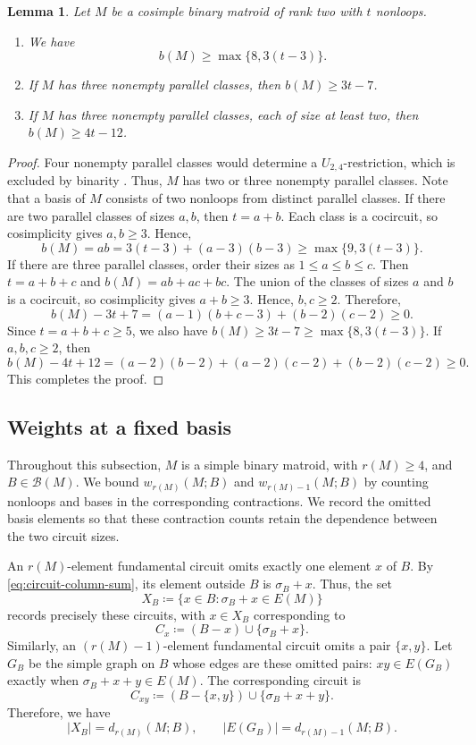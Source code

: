 \documentclass[10pt,a4paper]{article}
\numberwithin{equation}{section}
\newtheorem{lemma}[lemma]{Lemma}
\newcommand{\BB}{\mathcal B}
\newcommand{\wloc}[1]{w_{#1}(M;B)}
\newcommand{\dloc}[1]{d_{#1}(M;B)}
\begin{document}
\begin{lemma}\label{lem:rank-two}
Let \(M\) be a cosimple binary matroid of rank two with \(t\)
nonloops.
\begin{enumerate}
\item[\(\mathrm{(i)}\)] We have
\[
 b(M)\ge\max\{8,3(t-3)\}.
\]
\item[\(\mathrm{(ii)}\)] If \(M\) has three nonempty parallel classes, then
\(b(M)\ge3t-7\).
\item[\(\mathrm{(iii)}\)] If \(M\) has three nonempty parallel classes,
each of size at least two, then \(b(M)\ge4t-12\).
\end{enumerate}
\end{lemma}
\begin{proof}
Four nonempty parallel classes would determine a \(U_{2,4}\)-restriction,
which is excluded by binarity \cite[Theorem~6.5.4]{Oxley2011}.
Thus, \(M\) has two or three nonempty parallel classes. Note that
a basis of \(M\) consists of two nonloops from distinct parallel
classes. If there are two parallel classes of sizes \(a,b\), then
\(t=a+b\). Each class is a cocircuit, so cosimplicity gives
\(a,b\ge3\). Hence,
\[
 b(M)=ab=3(t-3)+(a-3)(b-3)\ge\max\{9,3(t-3)\}.
\]
If there are three parallel classes, order their sizes as
\(1\le a\le b\le c\). Then \(t=a+b+c\) and
\(b(M)=ab+ac+bc\). The union of the classes of sizes \(a\) and \(b\)
is a cocircuit, so cosimplicity gives \(a+b\ge3\). Hence,
\(b,c\ge2\). Therefore,
\[
 b(M)-3t+7
 =(a-1)(b+c-3)+(b-2)(c-2)\ge0.
\]
Since \(t=a+b+c\ge5\), we also have
\(b(M)\ge3t-7\ge\max\{8,3(t-3)\}\).
If \(a,b,c\ge2\), then
\[
 b(M)-4t+12
 =(a-2)(b-2)+(a-2)(c-2)+(b-2)(c-2)\ge0.
\]
This completes the proof.
\end{proof}

\subsection{Weights at a fixed basis}

Throughout this subsection, \(M\) is a simple binary matroid,
with \(r(M)\ge4\), and \(B\in\BB(M)\).
We bound \(\wloc{r(M)}\) and \(\wloc{r(M)-1}\) by counting
nonloops and bases in the corresponding contractions.
We record the omitted basis elements so that these contraction
counts retain the dependence between the two circuit sizes.

An \(r(M)\)-element fundamental circuit omits exactly one
element \(x\) of \(B\). By \eqref{eq:circuit-column-sum}, its
element outside \(B\) is \(\sigma_B+x\). Thus, the set
\[
 X_B\coloneqq\{x\in B:\sigma_B+x\in E(M)\}
\]
records precisely
these circuits, with \(x\in X_B\) corresponding to
\[
 C_x\coloneqq(B-x)\cup\{\sigma_B+x\}.
\]
Similarly, an \((r(M)-1)\)-element fundamental circuit omits
a pair \(\{x,y\}\). Let \(G_B\) be the simple graph on \(B\)
whose edges are these omitted pairs: \(xy\in E(G_B)\) exactly
when \(\sigma_B+x+y\in E(M)\). The corresponding circuit is
\[
 C_{xy}\coloneqq(B-\{x,y\})\cup\{\sigma_B+x+y\}.
\]
Therefore, we have
\begin{equation}\label{eq:graph-counts}
 |X_B|=\dloc{r(M)},\qquad |E(G_B)|=\dloc{r(M)-1}.
\end{equation}
\end{document}
